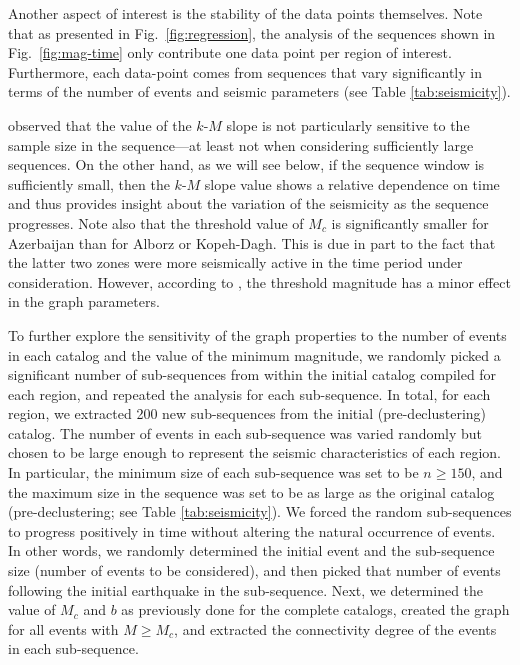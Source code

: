 Another aspect of interest is the stability of the data points themselves. Note that as presented in Fig.~\ref{fig:regression}, the analysis of the sequences shown in Fig.~\ref{fig:mag-time} only contribute one data point per region of interest. Furthermore, each data-point comes from sequences that vary significantly in terms of the number of events and seismic parameters (see Table \ref{tab:seismicity}). 

\citet{Telesca2013} observed that the value of the $k$-$M$ slope is not particularly sensitive to the sample size in the sequence---at least not when considering sufficiently large sequences. On the other hand, as we will see below, if the sequence window is sufficiently small, then the $k$-$M$ slope value shows a relative dependence on time and thus provides insight about the variation of the seismicity as the sequence progresses. Note also that the threshold value of $M_c$ is significantly smaller for Azerbaijan than for Alborz or Kopeh-Dagh. This is due in part to the fact that the latter two zones were more seismically active in the time period under consideration. However, according to \citet{Telesca2012}, the threshold magnitude has a minor effect in the graph parameters.

To further explore the sensitivity of the graph properties to the number of events in each catalog and the value of the minimum magnitude, we randomly picked a significant number of sub-sequences from within the initial catalog compiled for each region, and repeated the analysis for each sub-sequence. In total, for each region, we extracted 200 new sub-sequences from the initial (pre-declustering) catalog. The number of events in each sub-sequence was varied randomly but chosen to be large enough to represent the seismic characteristics of each region. In particular, the minimum size of each sub-sequence was set to be $n \geq 150$, and the maximum size in the sequence was set to be as large as the original catalog (pre-declustering; see Table \ref{tab:seismicity}). We forced the random sub-sequences to progress positively in time without altering the natural occurrence of events. In other words, we randomly determined the initial event and the sub-sequence size (number of events to be considered), and then picked that number of events following the initial earthquake in the sub-sequence. Next, we determined the value of $M_c$ and $b$ as previously done for the complete catalogs, created the graph for all events with $M \geq M_c$, and extracted the connectivity degree of the events in each sub-sequence. 

